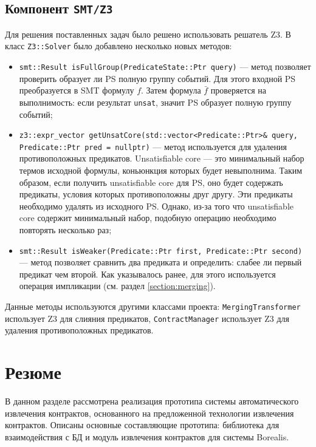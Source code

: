 \subsection{Компонент \texttt{SMT/Z3}}
Для решения поставленных задач было решено использовать решатель Z3. В класс \texttt{Z3::Solver} было добавлено несколько новых методов:
\begin{itemize}
\item \texttt{smt::Result isFullGroup(PredicateState::Ptr query)} --- метод позволяет проверить образует ли PS полную группу событий. Для этого входной PS преобразуется в SMT формулу $f$. Затем формула $\bar{f}$ проверяется на выполнимость: если результат \texttt{unsat}, значит PS образует полную группу событий;
\item \texttt{z3::expr_vector getUnsatCore(std::vector<Predicate::Ptr>\& query, Predicate::Ptr pred = nullptr)} --- метод используется для удаления противоположных предикатов. Unsatisfiable core\cite{unsatcore} --- это минимальный набор термов исходной формулы, коньюнкция которых будет невыполнима. Таким образом, если получить unsatisfiable core для PS, оно будет содержать предикаты, условия которых противоположны друг другу. Эти предикаты необходимо удалять из исходного PS. Однако, из-за того что unsatisfiable core содержит минимальный набор, подобную операцию необходимо повторять несколько раз;
\item \texttt{smt::Result isWeaker(Predicate::Ptr first, Predicate::Ptr second)} --- метод позволяет сравнить два предиката и определить: слабее ли первый предикат чем второй. Как указывалось ранее, для этого используется операция импликации (см. раздел \ref{section:merging}).
\end{itemize}

Данные методы используются другими классами проекта: \texttt{MergingTransformer} использует Z3 для слияния предикатов, \texttt{ContractManager} использует Z3 для удаления противоположных предикатов.

\section{Резюме}
В данном разделе рассмотрена реализация прототипа системы автоматического извлечения контрактов, основанного на предложенной технологии извлечения контрактов. Описаны основные составляющие прототипа: библиотека для взаимодействия с БД и модуль извлечения контрактов для системы Borealis. 